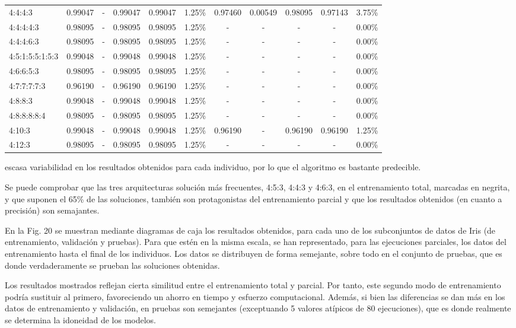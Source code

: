 \documentclass[spanish,a4paper,12pt,twoside]{report}
\begin{document}
\begin{landscape}
\begin{center}
\begin{tabular}{l c c c c r c c c c r}
        4:4:4:3 & 0.99047 & - & 0.99047 & 0.99047 & 1.25\% & 0.97460 & 0.00549 & 0.98095 & 0.97143 & 3.75\% \\
        4:4:4:4:3 & 0.98095 & - & 0.98095 & 0.98095 & 1.25\% & - & - & - & - & 0.00\% \\
        4:4:4:6:3 & 0.98095 & - & 0.98095 & 0.98095 & 1.25\% & - & - & - & - & 0.00\% \\
        4:5:1:5:5:1:5:3 & 0.99048 & - & 0.99048 & 0.99048 & 1.25\% & - & - & - & - & 0.00\% \\
        4:6:6:5:3 & 0.98095 & - & 0.98095 & 0.98095 & 1.25\% & - & - & - & - & 0.00\% \\
        4:7:7:7:7:3 & 0.96190 & - & 0.96190 & 0.96190 & 1.25\% & - & - & - & - & 0.00\% \\ 
        4:8:8:3 & 0.99048 & - & 0.99048 & 0.99048 & 1.25\% & - & - & - & - & 0.00\% \\
        4:8:8:8:8:4 & 0.98095 & - & 0.98095 & 0.98095 & 1.25\% & - & - & - & - & 0.00\% \\
        4:10:3 & 0.99048 & - & 0.99048 & 0.99048 & 1.25\% & 0.96190 & - & 0.96190 & 0.96190 & 1.25\% \\
        4:12:3 & 0.98095 & - & 0.98095 & 0.98095 & 1.25\% & - & - & - & - & 0.00\% \\[1ex]
        \hline
      \end{tabular}
    \end{center}
  \end{landscape}
  \noindent escasa variabilidad en los resultados obtenidos para cada individuo, por lo que el algoritmo es bastante predecible. \par
  Se puede comprobar que las tres arquitecturas solución más frecuentes, 4:5:3, 4:4:3 y 4:6:3, en el entrenamiento total, marcadas en negrita, y que suponen el 65\% de las soluciones, también son protagonistas del entrenamiento parcial y que los resultados obtenidos (en cuanto a precisión) son semajantes. \par
  En la Fig. 20 se muestran mediante diagramas de caja los resultados obtenidos, para cada uno de los subconjuntos de datos de Iris (de entrenamiento, validación y pruebas). Para que estén en la misma escala, se han representado, para las ejecuciones parciales, los datos del entrenamiento hasta el final de los individuos. Los datos se distribuyen de forma semejante, sobre todo en el conjunto de pruebas, que es donde verdaderamente se prueban las soluciones obtenidas. \par
  Los resultados mostrados reflejan cierta similitud entre el entrenamiento total y parcial. Por tanto, este segundo modo de entrenamiento podría sustituir al primero, favoreciendo un ahorro en tiempo y esfuerzo computacional. Además, si bien las diferencias se dan más en los datos de entrenamiento y validación, en pruebas son semejantes (exceptuando 5 valores atípicos de 80 ejecuciones), que es donde realmente se determina la idoneidad de los modelos.
\end{document}
